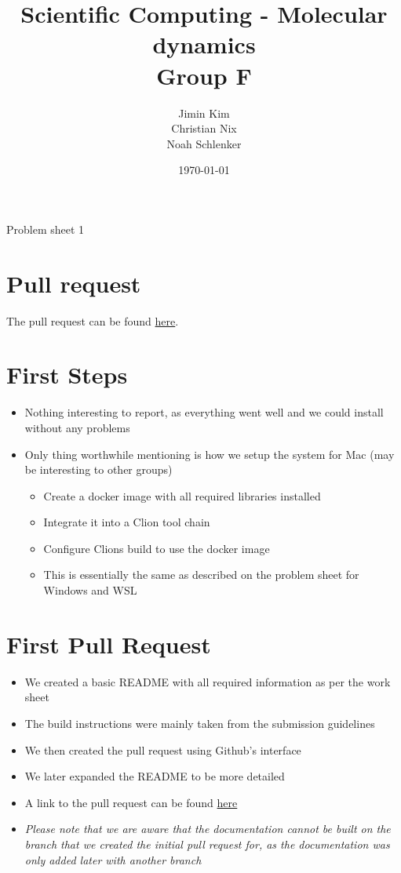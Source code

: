 \documentclass{article}
\title{Scientific Computing - Molecular dynamics \\ Group F}
\author{
    Jimin Kim \\
    Christian Nix \\
    Noah Schlenker
}
\date{\today}
\newcommand{\subtitle}{Problem sheet 1}
\begin{document}
\maketitle

\begin{center}
    \LARGE \subtitle{}
\end{center}

\section{Pull request}
The pull request can be found \href{https://github.com/noahpy/MolSim-SS24/pull/10}{here}.

\section{First Steps}

\begin{itemize}
    \item Nothing interesting to report, as everything went well and we could install without any problems
    \item Only thing worthwhile mentioning is how we setup the system for Mac (may be interesting to other groups)
    \begin{itemize}
        \item Create a docker image with all required libraries installed
        \item Integrate it into a Clion tool chain
        \item Configure Clions build to use the docker image
        \item This is essentially the same as described on the problem sheet for Windows and WSL 
    \end{itemize}
\end{itemize}

\section{First Pull Request}

\begin{itemize}
    \item We created a basic README with all required information as per the work sheet
    \item The build instructions were mainly taken from the submission guidelines
    \item We then created the pull request using Github's interface
    \item We later expanded the README to be more detailed
    \item A link to the pull request can be found \href{https://github.com/noahpy/MolSim-SS24/pull/1}{here}
    \item \emph{Please note that we are aware that the documentation cannot be built on the branch that we created the initial pull request for, as the documentation was only added later with another branch}
\end{itemize}
\end{document}
